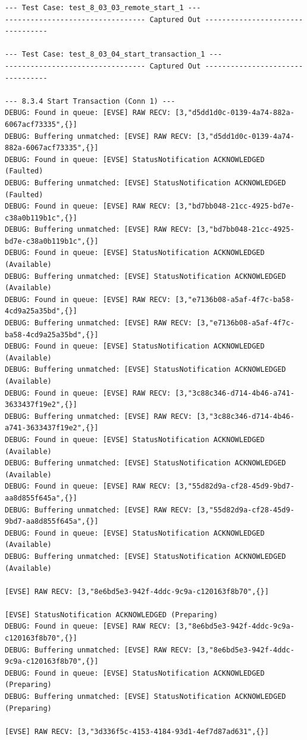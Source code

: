 \documentclass{article}
\begin{document}
\begin{lstlisting}
--- Test Case: test_8_03_03_remote_start_1 ---
--------------------------------- Captured Out ---------------------------------

--- Test Case: test_8_03_04_start_transaction_1 ---
--------------------------------- Captured Out ---------------------------------

--- 8.3.4 Start Transaction (Conn 1) ---
DEBUG: Found in queue: [EVSE] RAW RECV: [3,"d5dd1d0c-0139-4a74-882a-6067acf73335",{}]
DEBUG: Buffering unmatched: [EVSE] RAW RECV: [3,"d5dd1d0c-0139-4a74-882a-6067acf73335",{}]
DEBUG: Found in queue: [EVSE] StatusNotification ACKNOWLEDGED (Faulted)
DEBUG: Buffering unmatched: [EVSE] StatusNotification ACKNOWLEDGED (Faulted)
DEBUG: Found in queue: [EVSE] RAW RECV: [3,"bd7bb048-21cc-4925-bd7e-c38a0b119b1c",{}]
DEBUG: Buffering unmatched: [EVSE] RAW RECV: [3,"bd7bb048-21cc-4925-bd7e-c38a0b119b1c",{}]
DEBUG: Found in queue: [EVSE] StatusNotification ACKNOWLEDGED (Available)
DEBUG: Buffering unmatched: [EVSE] StatusNotification ACKNOWLEDGED (Available)
DEBUG: Found in queue: [EVSE] RAW RECV: [3,"e7136b08-a5af-4f7c-ba58-4cd9a25a35bd",{}]
DEBUG: Buffering unmatched: [EVSE] RAW RECV: [3,"e7136b08-a5af-4f7c-ba58-4cd9a25a35bd",{}]
DEBUG: Found in queue: [EVSE] StatusNotification ACKNOWLEDGED (Available)
DEBUG: Buffering unmatched: [EVSE] StatusNotification ACKNOWLEDGED (Available)
DEBUG: Found in queue: [EVSE] RAW RECV: [3,"3c88c346-d714-4b46-a741-3633437f19e2",{}]
DEBUG: Buffering unmatched: [EVSE] RAW RECV: [3,"3c88c346-d714-4b46-a741-3633437f19e2",{}]
DEBUG: Found in queue: [EVSE] StatusNotification ACKNOWLEDGED (Available)
DEBUG: Buffering unmatched: [EVSE] StatusNotification ACKNOWLEDGED (Available)
DEBUG: Found in queue: [EVSE] RAW RECV: [3,"55d82d9a-cf28-45d9-9bd7-aa8d855f645a",{}]
DEBUG: Buffering unmatched: [EVSE] RAW RECV: [3,"55d82d9a-cf28-45d9-9bd7-aa8d855f645a",{}]
DEBUG: Found in queue: [EVSE] StatusNotification ACKNOWLEDGED (Available)
DEBUG: Buffering unmatched: [EVSE] StatusNotification ACKNOWLEDGED (Available)

[EVSE] RAW RECV: [3,"8e6bd5e3-942f-4ddc-9c9a-c120163f8b70",{}]

[EVSE] StatusNotification ACKNOWLEDGED (Preparing)
DEBUG: Found in queue: [EVSE] RAW RECV: [3,"8e6bd5e3-942f-4ddc-9c9a-c120163f8b70",{}]
DEBUG: Buffering unmatched: [EVSE] RAW RECV: [3,"8e6bd5e3-942f-4ddc-9c9a-c120163f8b70",{}]
DEBUG: Found in queue: [EVSE] StatusNotification ACKNOWLEDGED (Preparing)
DEBUG: Buffering unmatched: [EVSE] StatusNotification ACKNOWLEDGED (Preparing)

[EVSE] RAW RECV: [3,"3d336f5c-4153-4184-93d1-4ef7d87ad631",{}]


\end{lstlisting}
\end{document}
